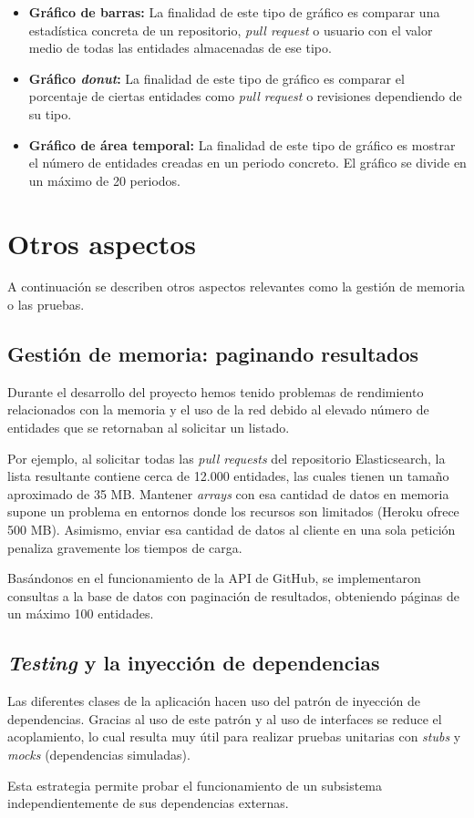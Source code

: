 \begin{itemize}
\tightlist
	\item \textbf{Gráfico de barras:} La finalidad de este tipo de gráfico es comparar una estadística concreta de un repositorio, \textit{pull request} o usuario con el valor medio de todas las entidades almacenadas de ese tipo.
	\item \textbf{Gráfico \textit{donut}:} La finalidad de este tipo de gráfico es comparar el porcentaje de ciertas entidades como \textit{pull request} o revisiones dependiendo de su tipo.
	\item \textbf{Gráfico de área temporal:} La finalidad de este tipo de gráfico es mostrar  el número de entidades creadas en un periodo concreto. El gráfico se divide en un máximo de 20 periodos.
\end{itemize}



\section{Otros aspectos}

A continuación se describen otros aspectos relevantes como la gestión de memoria o las pruebas.

\subsection{Gestión de memoria: paginando resultados}

Durante el desarrollo del proyecto hemos tenido problemas de rendimiento relacionados con la memoria y el uso de la red debido al elevado número de entidades que se retornaban al solicitar un listado.

Por ejemplo, al solicitar todas las \textit{pull requests} del repositorio Elasticsearch, la lista resultante contiene cerca de 12.000 entidades, las cuales tienen un tamaño aproximado de 35 MB. Mantener \textit{arrays} con esa cantidad de datos en memoria supone un problema en entornos donde los recursos son limitados (Heroku ofrece 500 MB). Asimismo, enviar esa cantidad de datos al cliente en una sola petición penaliza gravemente los tiempos de carga.

Basándonos en el funcionamiento de la API de GitHub, se implementaron consultas a la base de datos con paginación de resultados, obteniendo páginas de un máximo 100 entidades.

\subsection{\textit{Testing} y la inyección de dependencias}

Las diferentes clases de la aplicación hacen uso del patrón de inyección de dependencias. Gracias al uso de este patrón y al uso de interfaces se reduce el acoplamiento, lo cual resulta muy útil para realizar pruebas unitarias con \textit{stubs} y \textit{mocks} (dependencias simuladas).

Esta estrategia permite probar el funcionamiento de un subsistema independientemente de sus dependencias externas.

